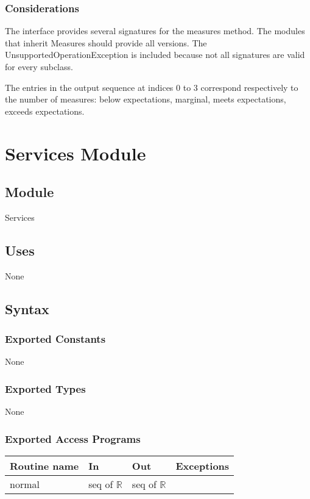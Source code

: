\documentclass[12pt]{article}
\begin{document}
\subsubsection* {Considerations}

The interface provides several signatures for the measures method.  The modules
that inherit Measures should provide all versions.  The
UnsupportedOperationException is included because not all signatures are valid
for every subclass.

The entries in the output sequence at indices 0 to 3 correspond respectively to
the number of measures: below expectations, marginal, meets expectations,
exceeds expectations.

\newpage

\section* {Services Module}

\subsection*{Module}

Services

\subsection* {Uses}

None

\subsection* {Syntax}

\subsubsection* {Exported Constants}

None

\subsubsection* {Exported Types}

None

\subsubsection* {Exported Access Programs}

\begin{tabular}{| l | l | l | p{5cm} |}
\hline
\textbf{Routine name} & \textbf{In} & \textbf{Out} & \textbf{Exceptions}\\
\hline
normal & seq of $\mathbb{R}$ & seq of $\mathbb{R}$ & \\
\hline
\end{tabular}
\end{document}
